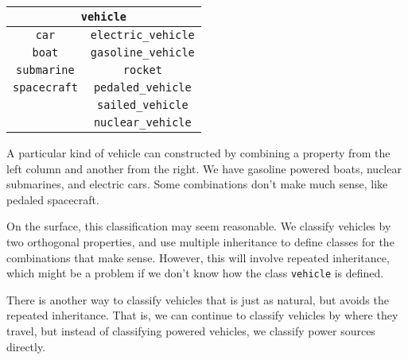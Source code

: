 \begin{center}
\begin{tabular}{|c|c|}
\hline
\multicolumn{2}{|c|}{\hbox{\lstinline/vehicle/}}\\
\hline
\hbox{\lstinline/car/} & \hbox{\lstinline/electric_vehicle/}\\
\hbox{\lstinline/boat/} & \hbox{\lstinline/gasoline_vehicle/}\\
\hbox{\lstinline/submarine/} & \hbox{\lstinline/rocket/}\\
\hbox{\lstinline/spacecraft/} & \hbox{\lstinline/pedaled_vehicle/}\\
& \hbox{\lstinline/sailed_vehicle/}\\
& \hbox{\lstinline/nuclear_vehicle/}\\
\hline
\end{tabular}
\end{center}
%
A particular kind of vehicle can constructed by combining a property from the left column and
another from the right.  We have gasoline powered boats, nuclear submarines, and electric cars.
Some combinations don't make much sense, like pedaled spacecraft.

On the surface, this classification may seem reasonable.  We classify vehicles by two
orthogonal properties, and use multiple inheritance to define classes for the combinations that make
sense.  However, this will involve repeated inheritance, which might be a problem if we don't know how
the class \hbox{\lstinline/vehicle/} is defined.

There is another way to classify vehicles that is just as natural, but avoids the repeated
inheritance.  That is, we can continue to classify vehicles by where they travel, but instead of
classifying powered vehicles, we classify power sources directly.

